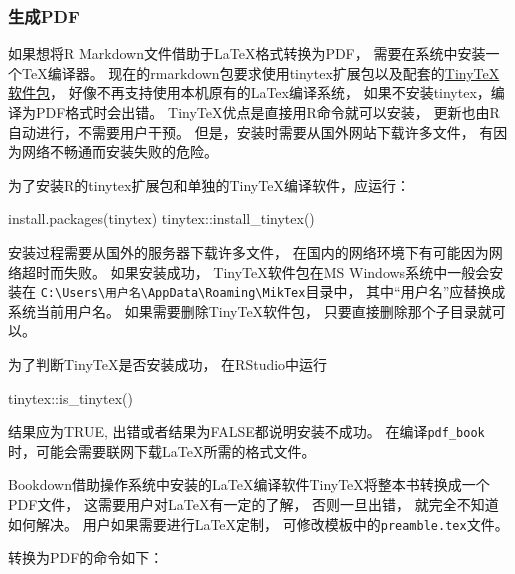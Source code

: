 \documentclass[
]{article}
\newenvironment{Shaded}{\begin{snugshade}}{\end{snugshade}}
\newcommand{\FunctionTok}[1]{\textcolor[rgb]{0.00,0.00,0.00}{#1}}
\newcommand{\NormalTok}[1]{#1}
\newcommand{\SpecialCharTok}[1]{\textcolor[rgb]{0.00,0.00,0.00}{#1}}
\newcommand{\StringTok}[1]{\textcolor[rgb]{0.31,0.60,0.02}{#1}}
\begin{document}
\hypertarget{usage-pdfbook}{%
\subsubsection{生成PDF}\label{usage-pdfbook}}

如果想将R Markdown文件借助于LaTeX格式转换为PDF，
需要在系统中安装一个TeX编译器。
现在的rmarkdown包要求使用tinytex扩展包以及配套的\href{https://yihui.name/tinytex/}{TinyTeX软件包}，
好像不再支持使用本机原有的LaTex编译系统，
如果不安装tinytex，编译为PDF格式时会出错。
TinyTeX优点是直接用R命令就可以安装，
更新也由R自动进行，不需要用户干预。
但是，安装时需要从国外网站下载许多文件，
有因为网络不畅通而安装失败的危险。

为了安装R的tinytex扩展包和单独的TinyTeX编译软件，应运行：

\begin{Shaded}
\begin{Highlighting}[]
\FunctionTok{install.packages}\NormalTok{(}\StringTok{\textquotesingle{}tinytex\textquotesingle{}}\NormalTok{)}
\NormalTok{tinytex}\SpecialCharTok{::}\FunctionTok{install\_tinytex}\NormalTok{()}
\end{Highlighting}
\end{Shaded}

安装过程需要从国外的服务器下载许多文件，
在国内的网络环境下有可能因为网络超时而失败。
如果安装成功，
TinyTeX软件包在MS Windows系统中一般会安装在 \texttt{C:\textbackslash{}Users\textbackslash{}用户名\textbackslash{}AppData\textbackslash{}Roaming\textbackslash{}MikTex}目录中，
其中``用户名''应替换成系统当前用户名。
如果需要删除TinyTeX软件包， 只要直接删除那个子目录就可以。

为了判断TinyTeX是否安装成功， 在RStudio中运行

\begin{Shaded}
\begin{Highlighting}[]
\NormalTok{tinytex}\SpecialCharTok{::}\FunctionTok{is\_tinytex}\NormalTok{()}
\end{Highlighting}
\end{Shaded}

结果应为TRUE, 出错或者结果为FALSE都说明安装不成功。
在编译\texttt{pdf\_book}时，可能会需要联网下载LaTeX所需的格式文件。

Bookdown借助操作系统中安装的LaTeX编译软件TinyTeX将整本书转换成一个PDF文件，
这需要用户对LaTeX有一定的了解，
否则一旦出错，
就完全不知道如何解决。
用户如果需要进行LaTeX定制，
可修改模板中的\texttt{preamble.tex}文件。

转换为PDF的命令如下：
\end{document}

